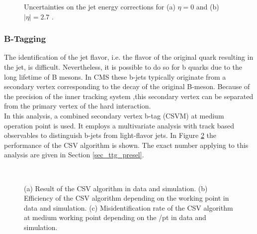 \begin{figure}[ht]
  \caption{Uncertainties on the jet energy corrections for (a) $\eta = 0$ and (b) $|\eta|=2.7$ \cite{Jet_Perf}.}
  \label{fig_reco_jet}
\end{figure}

\newpage
\subsubsection{B-Tagging}
\label{sec_reco_jet_btag}

The identification of the jet flavor, i.e. the flavor of the original quark resulting in the jet, is difficult. Nevertheless, it is possible to do so for b quarks due to the long lifetime of B mesons. In CMS these b-jets typically originate from a secondary vertex corresponding to the decay of the original B-meson. Because of the precision of the inner tracking system ,this secondary vertex can be separated from the primary vertex of the hard interaction. \\
In this analysis, a combined secondary vertex b-tag (CSVM) \cite{Chatrchyan:2012jua} at medium operation point is used. It employs a multivariate analysis with track based observables to distinguish b-jets from light-flavor jets. In Figure \ref{fig_reco_btag} the performance of the CSV algorithm is shown. The exact number applying to this analysis are given in Section \ref{sec_ttg_presel}. \\

\begin{figure}[ht]
\centering
    \\
  \caption{(a) Result of the CSV algorithm in data and simulation. (b) Efficiency of the CSV algorithm depending on the working point in data and simulation. (c) Misidentification rate of the CSV algorithm at medium working point depending on the /pt in data and simulation. \cite{CMS-PAS-BTV-13-001}}
  \label{fig_reco_btag}
\end{figure}